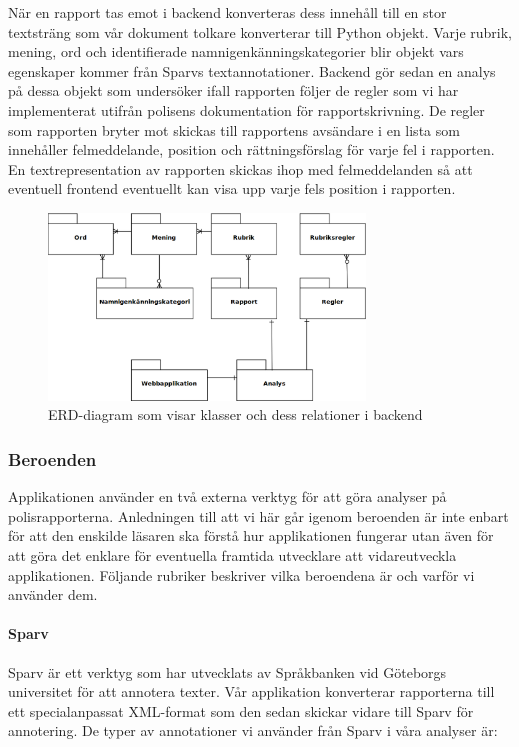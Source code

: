 \documentclass[swedish]{maucsthesis}
\begin{document}
När en rapport tas emot i backend konverteras dess innehåll till en stor
textsträng som vår dokument tolkare konverterar till Python objekt. Varje
rubrik, mening, ord och identifierade namnigenkänningskategorier blir objekt
vars egenskaper kommer från Sparvs textannotationer. Backend gör sedan en analys
på dessa objekt som undersöker ifall rapporten följer de regler som vi har
implementerat utifrån polisens dokumentation för rapportskrivning. De regler som
rapporten bryter mot skickas till rapportens avsändare i en lista som innehåller
felmeddelande, position och rättningsförslag för varje fel i rapporten. En
textrepresentation av rapporten skickas ihop med felmeddelanden så att eventuell
frontend eventuellt kan visa upp varje fels position i rapporten.

\begin{figure}[H]
    \centering
    \includegraphics[width=0.75\textwidth]{backenderd}
    \caption{ERD-diagram som visar klasser och dess relationer i backend}
    \label{fig:erdbackend}
\end{figure}

\subsubsection{Beroenden}

Applikationen använder en två externa verktyg för att göra analyser på
polisrapporterna. Anledningen till att vi här går igenom beroenden är inte
enbart för att den enskilde läsaren ska förstå hur applikationen fungerar utan
även för att göra det enklare för eventuella framtida utvecklare att
vidareutveckla applikationen. Följande rubriker beskriver vilka beroendena är
och varför vi använder dem.

\paragraph*{Sparv}
Sparv är ett verktyg som har utvecklats av Språkbanken vid Göteborgs universitet
för att annotera texter. Vår applikation konverterar rapporterna till ett
specialanpassat XML-format som den sedan skickar vidare till Sparv för
annotering. De typer av annotationer vi använder från Sparv i våra analyser är:
\end{document}
